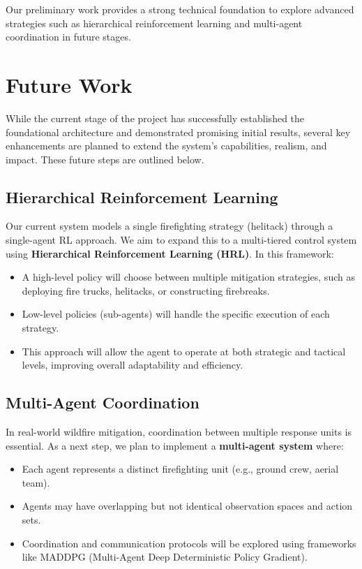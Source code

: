 \documentclass[conference]{IEEEtran}
\begin{document}
\noindent
Our preliminary work provides a strong technical foundation to explore advanced strategies such as hierarchical reinforcement learning and multi-agent coordination in future stages.

\section{Future Work}

While the current stage of the project has successfully established the foundational architecture and demonstrated promising initial results, several key enhancements are planned to extend the system’s capabilities, realism, and impact. These future steps are outlined below.

\subsection{Hierarchical Reinforcement Learning}
Our current system models a single firefighting strategy (helitack) through a single-agent RL approach. We aim to expand this to a multi-tiered control system using \textbf{Hierarchical Reinforcement Learning (HRL)}. In this framework:

\begin{itemize}
    \item A high-level policy will choose between multiple mitigation strategies, such as deploying fire trucks, helitacks, or constructing firebreaks.
    \item Low-level policies (sub-agents) will handle the specific execution of each strategy.
    \item This approach will allow the agent to operate at both strategic and tactical levels, improving overall adaptability and efficiency.
\end{itemize}

\subsection{Multi-Agent Coordination}
In real-world wildfire mitigation, coordination between multiple response units is essential. As a next step, we plan to implement a \textbf{multi-agent system} where:

\begin{itemize}
    \item Each agent represents a distinct firefighting unit (e.g., ground crew, aerial team).
    \item Agents may have overlapping but not identical observation spaces and action sets.
    \item Coordination and communication protocols will be explored using frameworks like MADDPG (Multi-Agent Deep Deterministic Policy Gradient).
\end{itemize}
\end{document}
